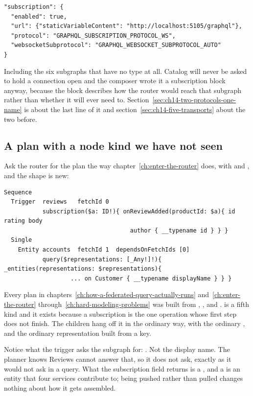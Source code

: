 \begin{verbatim}
"subscription": {
  "enabled": true,
  "url": {"staticVariableContent": "http://localhost:5105/graphql"},
  "protocol": "GRAPHQL_SUBSCRIPTION_PROTOCOL_WS",
  "websocketSubprotocol": "GRAPHQL_WEBSOCKET_SUBPROTOCOL_AUTO"
}
\end{verbatim}

Including the six subgraphs that have no  type at all.
Catalog will never be asked to hold a connection open and the composer wrote it
a subscription block anyway, because the block describes how the router would
reach that subgraph rather than whether it will ever need to.
Section~\ref{sec:ch14-two-protocols-one-name} is about the last line of it and
section~\ref{sec:ch14-five-transports} about the two before.

\subsection*{A plan with a node kind we have not seen}

%
Ask the router for the plan the way chapter~\ref{ch:enter-the-router} does,
with  and , and the shape
is new:

\begin{verbatim}
Sequence
  Trigger  reviews   fetchId 0
           subscription($a: ID!){ onReviewAdded(productId: $a){ id rating body
                                    author { __typename id } } }
  Single
    Entity accounts  fetchId 1  dependsOnFetchIds [0]
           query($representations: [_Any!]!){ _entities(representations: $representations){
                   ... on Customer { __typename displayName } } }
\end{verbatim}

Every plan in chapters~\ref{ch:how-a-federated-query-actually-runs}
and~\ref{ch:enter-the-router} through~\ref{ch:hard-modeling-problems} was built
from , ,  and .
 is a fifth kind and it exists because a subscription is the one
operation whose first step does not finish. The children hang off it in the
ordinary way, with the ordinary , and the ordinary
representation built from a key.

%
Notice what the trigger asks the subgraph for: . Not the display name. The planner knows Reviews cannot answer that, so it
does not ask, exactly as it would not ask in a query. What the subscription
field returns is a , and a  is an entity that four
services contribute to; being pushed rather than pulled changes nothing about
how it gets assembled.

